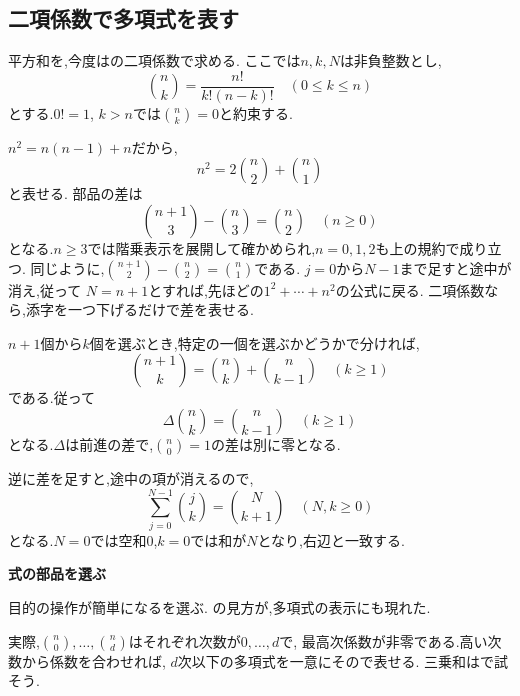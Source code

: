 \subsection{二項係数で多項式を表す}\label{節：二項係数と差分}
  平方和を,今度はの二項係数で求める.
  ここでは$n,k,N$は非負整数とし,
  \[
    \binom nk=\frac{n!}{k!(n-k)!}\quad(0\le k\le n)
  \]
  とする.$0!=1$, $k>n$では$\binom nk=0$と約束する.

  $n^2=n(n-1)+n$だから,
  \[
    n^2=2\binom n2+\binom n1
  \]
  と表せる.
  部品の差は
  \[
    \binom{n+1}{3}-\binom n3=\binom n2\quad(n\ge0)
  \]
  となる.$n\ge3$では階乗表示を展開して確かめられ,$n=0,1,2$も上の規約で成り立つ.
  同じように,$\binom{n+1}{2}-\binom n2=\binom n1$である.
  $j=0$から$N-1$まで足すと途中が消え,従って
  \BookMathLayout{\[
    \sum_{j=0}^{N-1}j^2=2\binom N3+\binom N2
     =\frac{N(N-1)(2N-1)}6.
  \]}{\[
    \begin{aligned}
      \sum_{j=0}^{N-1}j^2&=2\binom N3+\binom N2\\
      &=\frac{N(N-1)(2N-1)}6.
    \end{aligned}
  \]}
  $N=n+1$とすれば,先ほどの$1^2+\cdots+n^2$の公式に戻る.
  二項係数なら,添字を一つ下げるだけで差を表せる.

  $n+1$個から$k$個を選ぶとき,特定の一個を選ぶかどうかで分ければ,
  \[
    \binom{n+1}{k}=\binom nk+\binom n{k-1}\quad(k\ge1)
  \]
  である.従って
  \[
    \Delta\binom nk=\binom n{k-1}\quad(k\ge1)
  \]
  となる.$\Delta$は前進の差で,$\binom n0=1$の差は別に零となる.

  逆に差を足すと,途中の項が消えるので,
  \[
    \sum_{j=0}^{N-1}\binom jk=\binom N{k+1}
    \quad(N,k\ge0)
  \]
  となる.$N=0$では空和$0$,$k=0$では和が$N$となり,右辺と一致する.
  \BookFigBinomialDifference

  \begin{bookpoint}
    \textbf{式の部品を選ぶ}\par
    目的の操作が簡単になるを選ぶ.
    の見方が,多項式の表示にも現れた.
  \end{bookpoint}
  実際,$\binom n0,\ldots,\binom nd$はそれぞれ次数が$0,\ldots,d$で,
  最高次係数が非零である.高い次数から係数を合わせれば,
  $d$次以下の多項式を一意にそので表せる.
  三乗和はで試そう.
